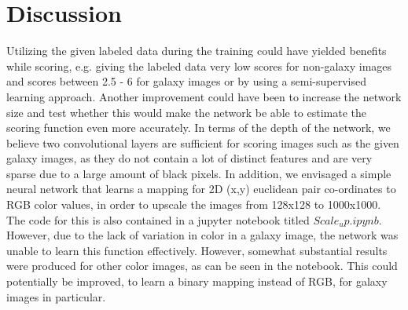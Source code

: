 \documentclass[journal]{IEEEtran}
\begin{document}
\section{Discussion}
\label{sec:discussion}
Utilizing the given labeled data during the training could have yielded benefits while scoring, e.g. giving the labeled data very low scores for non-galaxy images and scores between 2.5 - 6 for galaxy images or by using a semi-supervised learning approach. 
Another improvement could have been to increase the network size and test whether this would make the network be able to estimate the scoring function even more accurately. In terms of the depth of the network, we believe two convolutional layers are sufficient for scoring images such as the given galaxy images, as they do not contain a lot of distinct features and are very sparse due to a large amount of black pixels.
In addition, we envisaged a simple neural network that learns a mapping for 2D (x,y) euclidean pair co-ordinates to RGB color values, in order to upscale the images from 128x128 to 1000x1000. The code for this is also contained in a jupyter notebook titled $Scale_up.ipynb$. However, due to the lack of variation in color in a galaxy image, the network was unable to learn this function effectively. However, somewhat substantial results were produced for other color images, as can be seen in the notebook. This could potentially be improved, to learn a binary mapping instead of RGB, for galaxy images in particular. 
\end{document}
